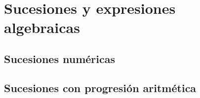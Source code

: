 \thispagestyle{plain}

\section{Sucesiones y expresiones algebraicas}

\subsection{Sucesiones numéricas}

\subsection{Sucesiones con progresión aritmética}


\newpage 